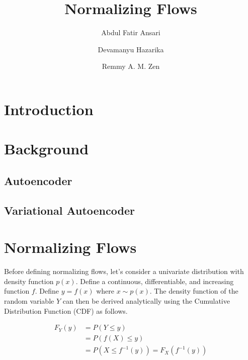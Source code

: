 \documentclass[runningheads]{llncs}
\begin{document}
%
\title{Normalizing Flows}
%
%
\author{Abdul Fatir Ansari \and
Devamanyu Hazarika \and
Remmy A. M. Zen}
%
%
%
\maketitle              %
%
\begin{abstract}


\end{abstract}
%
%
%
\section{Introduction}
\section{Background}
\subsection{Autoencoder}
\subsection{Variational Autoencoder}


\section{Normalizing Flows}

Before defining normalizing flows, let's consider a univariate distribution with density function $p(x)$. Define a continuous, differentiable, and increasing function $f$. Define $y = f(x)$ where $x \sim p(x)$. The density function of the random variable $Y$ can then be derived analytically using the Cumulative Distribution Function (CDF) as follows.

\begin{align}
F_{Y}(y) &= P(Y \leq y)\\
&= P(f(X) \leq y)\\
&= P(X \leq f^{-1}(y)) = F_{X}( f^{-1}(y))
\end{align}
\end{document}
